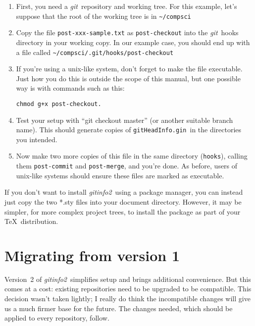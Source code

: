 \documentclass[a4paper,12pt,twoside,openany]{memoir}
\newcommand{\sfit}[1]{\textit{#1}}
\newcommand{\git}{\sfit{git}}
\newcommand{\tpname}{\sfit{gitinfo2}}
\newcommand{\ginname}{gitHeadInfo.gin}
\newcommand{\metaname}{\texttt{\ginname}}
\begin{document}
\begin{enumerate}

\item First, you need a \git\ repository and working tree.
For this example, let's suppose that the root of the working tree is in
\texttt{\textasciitilde/compsci}

\item Copy the file \texttt{post-xxx-sample.txt} as \texttt{post-checkout}
into the \git\ hooks directory in your working copy.
In our example case, you should end up with a file called
\texttt{\textasciitilde/compsci/.git/hooks/post-checkout}

\item If you're using a unix-like system,
don't forget to make the file executable.
Just how you do this is outside the scope of this manual,
but one possible way is with commands such as this:

\begin{verbatim}
chmod g+x post-checkout.
\end{verbatim}

\item Test your setup with ``git checkout master''
(or another suitable branch name).
This should generate copies of \metaname\ in the directories
you intended.

\item Now make two more copies of this file in the same directory (\texttt{hooks}), calling them
\texttt{post-commit} and \texttt{post-merge}, and you're done.
As before, users of unix-like systems should ensure these files are marked as executable.
\end{enumerate}

If you don't want to install \tpname\ using a package manager,
you can instead just copy the two *.sty files into your document directory.
However, it may be simpler, for more complex project trees,
to install the package as part of your \TeX\ distribution.

\section{Migrating from version 1}

Version~2 of \tpname\ simplifies setup and brings additional convenience.
But this comes at a cost:
existing repositories need to be upgraded to be compatible.
This decision wasn't taken lightly; I really do think the incompatible changes
will give us a much firmer base for the future.
The changes needed, which should be applied to every repository, follow.
\end{document}
